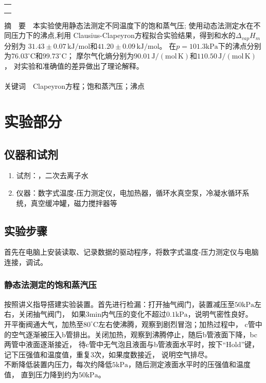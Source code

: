\documentclass[12pt]{article}
\newcommand{\mr}[1]{\mathrm{#1}}
\def\celsius{^{\circ}\mr{C}}  %
\begin{document}
\begin{titlepage}
\begin{center}
            \begin{tabular*}{\textwidth}{c}
                \\ %
                \\ %
                \\ %
                \\ %
                \hline %
            \end{tabular*}
        \end{center}
        \textsf{摘\ \ 要}\ \ 本实验使用静态法测定不同温度下的饱和蒸气压;
		使用动态法测定水在不同压力下的沸点,利用
		Clausius-Clapeyron方程拟合实验结果，得到和水的$\Delta_{vap}H_{m}$分别为
		$31.43 \pm 0.07\,\mr{kJ/mol}$和$41.20 \pm 0.09\,\mr{kJ/mol}$。
		在$p = 101.3\mr{kPa}$下的沸点分别为$76.03\celsius$和$99.73\celsius$；
		摩尔气化熵分别为$90.01\,\mr{J/(mol\,K)}$和$110.50\,\mr{J/(mol\,K)}$，
		对实验和准确值的差异做出了理论解释。
        \\
        \\
        \textsf{关键词}\ \ Clapeyron方程；饱和蒸汽压；沸点
    \end{titlepage}
	\vbox{}        
    \section{实验部分}
    	\subsection{仪器和试剂}
    	\begin{enumerate}
			\item 试剂：，二次去离子水
			\item 仪器：数字式温度-压力测定仪，电加热器，循环水真空泵，冷凝水循环系统，真空缓冲罐，磁力搅拌器等
		\end{enumerate}
    	
		\subsection{实验步骤}
			首先在电脑上安装读取、记录数据的驱动程序，将数字式温度-压力测定仪与电脑连接，调试。
			\subsubsection{静态法测定的饱和蒸汽压}
			按照讲义指导搭建实验装置。首先进行检漏：打开抽气阀门，装置减压至$50\mr{kPa}$左右，关闭抽气阀门，
			如果3min内气压的变化不超过$0.1\mr{kPa}$，说明气密性良好。\\
			开平衡阀通大气，加热至$80\celsius$左右使沸腾，观察到剧烈冒泡；加热过程中，
			c管中的空气逐渐被压入b管排出。关闭加热，观察到沸腾停止，随后b管液面下降，bc两管中液面逐渐接近，
			待c管中无气泡且液面与b管液面水平时，按下“Hold”键，记下压强值和温度值，重复3次，如果度数接近，
			说明空气排尽。\\
			不断降低装置内压力，每次约降低$5\mr{kPa}$，随后测定液面水平时的压强值和温度值，
			直到压力降到约为$50\mr{kPa}$。
\end{document}
